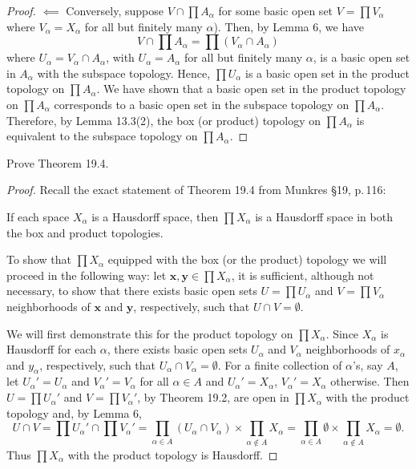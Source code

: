 \begin{proof}
$\impliedby$ Conversely, suppose $V\cap\prod A_\alpha$ for some
basic open set $V=\prod V_\alpha$ where $V_\alpha=X_\alpha$ for
all but finitely many $\alpha$). Then, by Lemma 6, we have
\[
V\cap\prod A_\alpha=\prod\left(V_\alpha\cap A_\alpha\right)
\]
where $U_\alpha=V_\alpha\cap A_\alpha$, with $U_\alpha=A_\alpha$
for all but finitely many $\alpha$, is a basic open set in
$A_\alpha$ with the subspace topology. Hence, $\prod U_\alpha$ is
a basic open set in the product topology on $\prod A_\alpha$. We
have shown that a basic open set in the product topology on
$\prod A_\alpha$ corresponds to a basic open set in the subspace
topology on $\prod A_\alpha$. Therefore, by Lemma 13.3(2), the
box (or product) topology on $\prod A_\alpha$ is equivalent to
the subspace topology on $\prod A_\alpha$.
\end{proof}
\newpage
\begin{problem}[Munkres \S19, p.\,118, \#3]
Prove Theorem 19.4.
\end{problem}
\begin{proof}
Recall the exact statement of Theorem 19.4 from Munkres \S19,
p.\,116:
\begin{theorem*}
If each space $X_\alpha$ is a Hausdorff space, then $\prod
X_\alpha$ is a Hausdorff space in both the box and product
topologies.
\end{theorem*}
To show that $\prod X_\alpha$ equipped with the box (or the
product) topology we will proceed in the following way: let
$\mathbf{x},\mathbf{y}\in\prod X_\alpha$, it is sufficient,
although not necessary, to show that there exists basic open sets
$U=\prod U_\alpha$ and $V=\prod V_\alpha$ neighborhoods of
$\mathbf{x}$ and $\mathbf{y}$, respectively, such that $U\cap
V=\emptyset$.

We will first demonstrate this for the product topology on $\prod
X_\alpha$. Since $X_\alpha$ is Hausdorff for each $\alpha$, there
exists basic open sets $U_\alpha$ and $V_\alpha$ neighborhoods of
$x_\alpha$ and $y_\alpha$, respectively, such that $U_\alpha\cap
V_\alpha=\emptyset$. For a finite collection of $\alpha$'s, say
$A$, let $U_\alpha'=U_\alpha$ and $V_\alpha'=V_\alpha$ for all
$\alpha\in A$ and $U_\alpha'=X_\alpha$, $V_\alpha'=X_\alpha$
otherwise. Then $U=\prod U_\alpha'$ and $V=\prod V_\alpha'$, by
Theorem 19.2, are open in $\prod X_\alpha$ with the product
topology and, by Lemma 6,
\[
U\cap V=\prod U_\alpha'\cap \prod V_\alpha'
=\prod_{\alpha\in A}\left(U_\alpha\cap
  V_\alpha\right)\times\prod_{\alpha\notin A}X_\alpha
=\prod_{\alpha\in A}\emptyset\times\prod_{\alpha\notin A}X_\alpha
=\emptyset.
\]
Thus $\prod X_\alpha$ with the product topology is Hausdorff.\qedhere

\end{proof}
